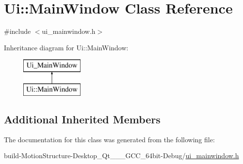 \hypertarget{class_ui_1_1_main_window}{\section{Ui\-:\-:Main\-Window Class Reference}
\label{class_ui_1_1_main_window}
}


{\ttfamily \#include $<$ui\-\_\-mainwindow.\-h$>$}

Inheritance diagram for Ui\-:\-:Main\-Window\-:\begin{figure}[H]
\begin{center}
\leavevmode
\includegraphics[height=2.000000cm]{class_ui_1_1_main_window}
\end{center}
\end{figure}
\subsection*{Additional Inherited Members}


The documentation for this class was generated from the following file\-:\begin{DoxyCompactItemize}
\item 
build-\/\-Motion\-Structure-\/\-Desktop\-\_\-\-Qt\-\_\-\_\-\_\-\-G\-C\-C\-\_\-64bit-\/\-Debug/\hyperlink{ui__mainwindow_8h}{ui\-\_\-mainwindow.\-h}\end{DoxyCompactItemize}

